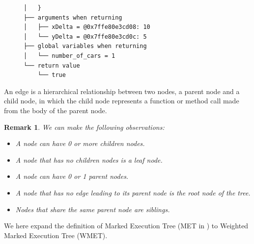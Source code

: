 \begin{definition}[Node]
\begin{exmp}
\begin{figure}[ht]
\begin{verbatim}
│   }                                                                                                                                                
├── arguments when returning                                                                                                                         
│   ├── xDelta = @0x7ffe80e3cd08: 10                                                                                                                 
│   └── yDelta = @0x7ffe80e3cd0c: 5                                                                                                                  
├── global variables when returning                                                                                                                  
│   └── number_of_cars = 1                                                                                                                           
└── return value                                                                                                                                     
    └── true
\end{verbatim}
\end{figure}
\end{exmp}

\end{definition}
\begin{definition}[Edge]
An edge is a hierarchical relationship between two nodes, a parent node and a child node, in which the child node represents a function or method call made from the body of the parent node.
\end{definition}
\newtheorem{remark}{Remark}
\begin{remark}
We can make the following observations:
\begin{itemize}
    \item A node can have 0 or more children nodes.
    \item A node that has no children nodes is a leaf node.
    \item A node can have 0 or 1 parent nodes.
    \item A node that has no edge leading to its parent node is the root node of the tree.
    \item Nodes that share the same parent node are siblings.
\end{itemize}
\end{remark}
We here expand the definition of Marked Execution Tree (MET in \citep{optimal_strategy}) to Weighted Marked Execution Tree (WMET).
